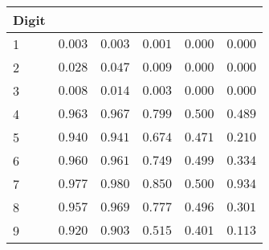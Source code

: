 \begin{table}[!tbp]
\begin{center}
\begin{tabular}{lrrrrr}
\hline\hline
\multicolumn{1}{l}{Digit}&\multicolumn{1}{c}{}&\multicolumn{1}{c}{}&\multicolumn{1}{c}{}&\multicolumn{1}{c}{}&\multicolumn{1}{c}{}\tabularnewline
\hline
1&$0.003$&$0.003$&$0.001$&$0.000$&$0.000$\tabularnewline
2&$0.028$&$0.047$&$0.009$&$0.000$&$0.000$\tabularnewline
3&$0.008$&$0.014$&$0.003$&$0.000$&$0.000$\tabularnewline
4&$0.963$&$0.967$&$0.799$&$0.500$&$0.489$\tabularnewline
5&$0.940$&$0.941$&$0.674$&$0.471$&$0.210$\tabularnewline
6&$0.960$&$0.961$&$0.749$&$0.499$&$0.334$\tabularnewline
7&$0.977$&$0.980$&$0.850$&$0.500$&$0.934$\tabularnewline
8&$0.957$&$0.969$&$0.777$&$0.496$&$0.301$\tabularnewline
9&$0.920$&$0.903$&$0.515$&$0.401$&$0.113$\tabularnewline
\hline
\end{tabular}\end{center}
\end{table}
